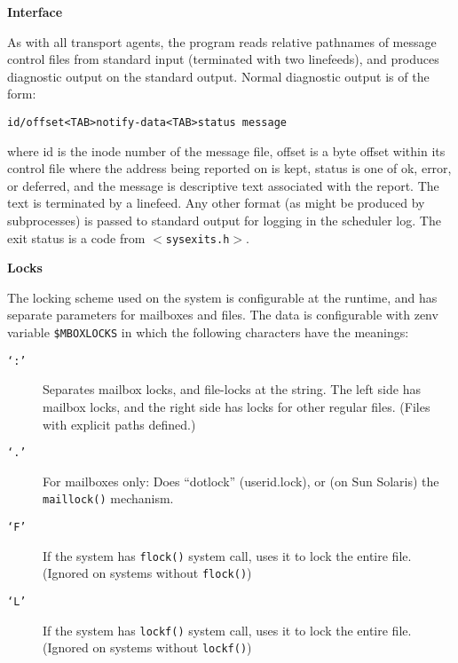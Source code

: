 {\bf Interface}

As with all transport agents, the program reads relative
pathnames of message control files from  standard input 
(terminated with two linefeeds), and produces diagnostic output on the
standard output. Normal diagnostic output is of the form:

\begin{tscreen}
\begin{verbatim}
id/offset<TAB>notify-data<TAB>status message
\end{verbatim}
\end{tscreen}


where id is the inode number of the message file, offset is a
byte offset within its control file where the address being
reported on is kept, status is one of ok, error, or deferred, and
the message is descriptive text associated with the report. The
text is terminated by a linefeed. Any other format (as might be
produced by subprocesses) is passed to standard output for 
logging in the scheduler log.
The exit status is a code from {\tt {\(<\)}sysexits.h{\(>\)}}.

{\bf Locks}

The locking scheme used on the system is configurable at the
runtime, and has separate parameters for mailboxes and files.
The data is configurable with zenv variable {\tt \$MBOXLOCKS} in which
the following characters have the meanings:

\begin{description}
\item[{\tt `:'}] \mbox{}

Separates mailbox locks, and file-locks at the string. The left
side has mailbox locks, and the right side has locks for other
regular files. (Files with explicit paths defined.)

\item[{\tt `.'}] \mbox{}

For mailboxes only: Does ``dotlock'' (userid.lock), or (on Sun
Solaris) the {\tt maillock()} mechanism.

\item[{\tt `F'}] \mbox{}

If the system has {\tt flock()} system call, uses it to lock 
the entire file. (Ignored on systems without {\tt flock()})

\item[{\tt `L'}] \mbox{}

If the system has {\tt lockf()} system call, uses it to lock 
the entire file. (Ignored on systems without {\tt lockf()}) 

\end{description}


